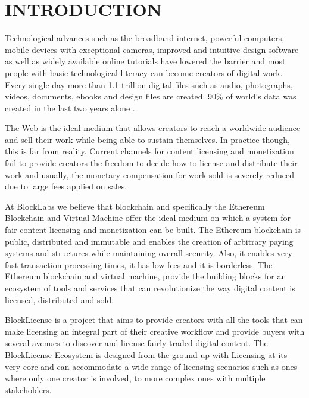 
\section{INTRODUCTION} \label{introduction}

 Technological advances such as the broadband internet, powerful computers, mobile devices with exceptional cameras, improved and intuitive design software as well as widely available online tutorials have lowered the barrier and most people with basic technological  literacy can become creators of digital work. Every single day more than 1.1 trillion digital files such as audio, photographs, videos, documents, ebooks and design files are created. 90\% of world's data was created in the last two years alone \cite{ibm}. 

The Web is the ideal medium that allows creators to reach a worldwide audience and sell their work while being able to sustain themselves. In practice though, this is far from reality. Current channels for content licensing and monetization fail to provide creators the freedom to decide how to license and distribute their work and usually, the monetary compensation for work sold is severely reduced due to large fees applied on sales.

At BlockLabs we believe that blockchain and specifically the Ethereum \cite{buterin2013ethereum} Blockchain and Virtual Machine offer the ideal medium on which a system for fair content licensing and monetization can be built. The Ethereum blockchain is public, distributed and immutable and enables the creation of arbitrary paying systems and structures while maintaining overall security. Also, it enables very fast transaction processing times, it has low fees and it is borderless. The Ethereum blockchain and virtual machine, provide the building blocks for an ecosystem of tools and services that can revolutionize the way digital content is licensed, distributed and sold.

BlockLicense is a project that aims to provide creators with all the tools that can make licensing an integral part of their creative workflow and provide buyers with several avenues to discover and license fairly-traded digital content. The BlockLicense Ecosystem is designed from the ground up with Licensing at its very core and can accommodate a wide range of licensing scenarios such as ones where only one creator is involved, to more complex ones with multiple stakeholders. 